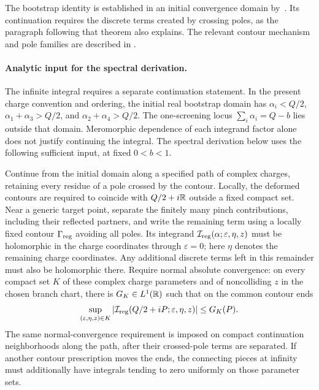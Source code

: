 The bootstrap identity is established in an initial convergence
domain by~\cite[Theorem~1.1]{GKRVBootstrap}. Its continuation
requires the discrete terms created by crossing poles, as the
paragraph following that theorem also explains. The relevant
contour mechanism and pole families are described in
\cite[Section~7.2, eqs.~(87)--(90)]{TeschnerRevisited}.

\paragraph{Analytic input for the spectral derivation.}
The infinite integral requires a separate continuation statement.
In the present charge convention and ordering, the initial real
bootstrap domain has $\alpha_i<Q/2$,
$\alpha_1+\alpha_3>Q/2$, and $\alpha_2+\alpha_4>Q/2$.
The one-screening locus $\sum_i\alpha_i=Q-b$ lies outside that
domain. Meromorphic dependence of each integrand factor alone
does not justify continuing the integral. The spectral derivation
below uses the following sufficient input, at fixed $0<b<1$.

Continue from the initial domain along a specified path of complex
charges, retaining every residue of a pole crossed by the contour.
Locally, the deformed contours are required to coincide with
$Q/2+i\mathbb R$ outside a fixed compact set. Near a generic target point,
separate the finitely many pinch contributions, including their
reflected partners, and write the remaining term using a locally
fixed contour $\Gamma_{\rm reg}$ avoiding all poles. Its integrand
$\mathcal I_{\rm reg}(\alpha;\varepsilon,\eta,z)$ must be holomorphic
in the charge coordinates through $\varepsilon=0$; here $\eta$
denotes the remaining charge coordinates. Any additional discrete
terms left in this remainder must also be holomorphic there.
Require normal absolute convergence: on every compact set $K$ of
these complex charge parameters and of noncolliding $z$ in the
chosen branch chart, there is $G_K\in L^1(\mathbb R)$ such that on the
common contour ends
\begin{equation}
 \sup_{(\varepsilon,\eta,z)\in K}
 \left|\mathcal I_{\rm reg}(Q/2+iP;\varepsilon,\eta,z)\right|
 \le G_K(P).
 \label{eq:screeningtailinput}
\end{equation}
The same normal-convergence requirement is imposed on compact
continuation neighborhoods along the path, after their crossed-pole
terms are separated. If another contour prescription moves the ends,
the connecting pieces at infinity must additionally have integrals
tending to zero uniformly on those parameter sets.

